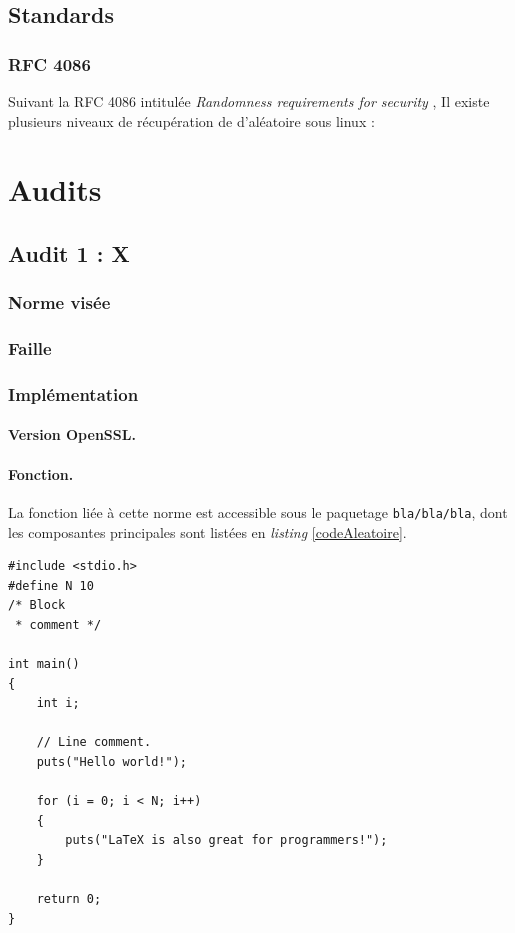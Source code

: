 \subsection{Standards}
\subsubsection{RFC 4086}
Suivant la RFC 4086 intitulée \textit{Randomness requirements for security} \nocite{rfc4086}, 
Il existe plusieurs niveaux de récupération de d'aléatoire sous linux  :


\section{Audits}
	\subsection{Audit 1 : X }
	\subsubsection{Norme visée}
	\subsubsection{Faille}
	\subsubsection{Implémentation}
		
		\paragraph{Version OpenSSL.\\}
		
		\paragraph{Fonction.\\}
		La fonction liée à cette norme est accessible sous le paquetage \texttt{bla/bla/bla}, dont les composantes principales sont listées en \textit{listing} \ref{codeAleatoire}.
		
		
		\begin{lstlisting}[style=customc,caption=codeAleatoire.c, label=codeAleatoire]
#include <stdio.h>
#define N 10
/* Block
 * comment */
 
int main()
{
    int i;
 
    // Line comment.
    puts("Hello world!");
 
    for (i = 0; i < N; i++)
    {
        puts("LaTeX is also great for programmers!");
    }
 
    return 0;
}
		\end{lstlisting}
		
